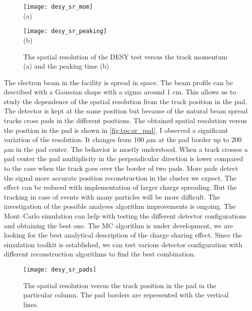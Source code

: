\documentclass[../main.tex]{subfiles}
\begin{document}
\begin{figure}[!ht]
  \centering
  \begin{minipage}{0.49\linewidth}
    \centering
    \texttt{[image: desy\_sr\_mom]} \\ (a)
  \end{minipage}
  \begin{minipage}{0.49\linewidth}
    \centering
    \texttt{[image: desy\_sr\_peaking]} \\ (b)
  \end{minipage}
  \caption{The spatial resolution of the DESY test versus the track momentum (a) and the peaking time (b)}
  \label{fig:tpc:sr2}
\end{figure}

The electron beam in the facility is spread in space. The beam profile can be described with a Gaussian shape with a sigma around 1 cm. This allows us to study the dependence of the spatial resolution from the track position in the pad. The detector is kept at the same position but because of the natural beam spread tracks cross pads in the different positions. The obtained spatial resolution versus the position in the pad is shown in \autoref{fig:tpc:sr_pad}. I observed a significant variation of the resolution. It changes from 100 $\mu\text{m}$ at the pad border up to 200 $\mu\text{m}$ in the pad center. The behavior is mostly understood. When a track crosses a pad center the pad multiplicity in the perpendicular direction is lower compared to the case when the track goes over the border of two pads. More pads detect the signal more accurate position reconstruction in the cluster we expect. The effect can be reduced with implementation of larger charge spreading. But the tracking in case of events with many particles will be more difficult. The investigation of the possible analyses algorithm improvements is ongoing. The Mont--Carlo simulation can help with testing the different detector configurations and obtaining the best one. The MC algorithm is under development, we are looking for the best analytical description of the charge sharing effect. Since the simulation toolkit is established, we can test various detector configuration with different reconstruction algorithms to find the best combination.

\begin{figure}[!ht]
  \centering
  \texttt{[image: desy\_sr\_pads]}
  \caption{The spatial resolution versus the track position in the pad in the particular column. The pad borders are represented with the vertical lines.}
  \label{fig:tpc:sr_pad}
\end{figure}
\end{document}
